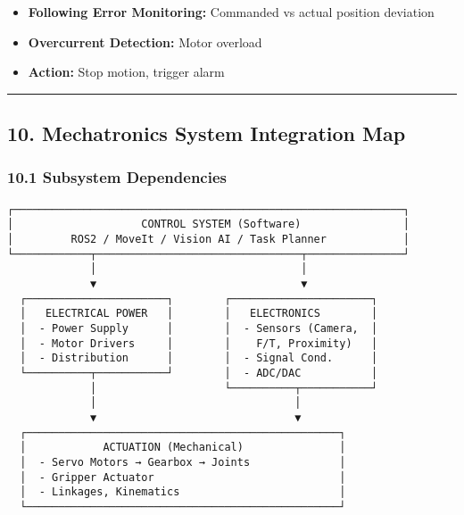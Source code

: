 \documentclass[
]{article}
\providecommand{\tightlist}{%
  \setlength{\itemsep}{0pt}\setlength{\parskip}{0pt}}
\begin{document}
\begin{itemize}
\tightlist
\item
  \textbf{Following Error Monitoring:} Commanded vs actual position
  deviation
\item
  \textbf{Overcurrent Detection:} Motor overload
\item
  \textbf{Action:} Stop motion, trigger alarm
\end{itemize}

\begin{center}\rule{0.5\linewidth}{0.5pt}\end{center}

\hypertarget{mechatronics-system-integration-map}{%
\subsection{10. Mechatronics System Integration
Map}\label{mechatronics-system-integration-map}}

\hypertarget{subsystem-dependencies}{%
\subsubsection{10.1 Subsystem
Dependencies}\label{subsystem-dependencies}}

\begin{verbatim}
┌─────────────────────────────────────────────────────────────┐
│                    CONTROL SYSTEM (Software)                │
│         ROS2 / MoveIt / Vision AI / Task Planner            │
└────────────┬────────────────────────────────┬───────────────┘
             │                                │
             ▼                                ▼
  ┌──────────────────────┐        ┌──────────────────────┐
  │   ELECTRICAL POWER   │        │   ELECTRONICS        │
  │  - Power Supply      │        │  - Sensors (Camera,  │
  │  - Motor Drivers     │        │    F/T, Proximity)   │
  │  - Distribution      │        │  - Signal Cond.      │
  └──────────┬───────────┘        │  - ADC/DAC           │
             │                    └──────────┬───────────┘
             │                               │
             ▼                               ▼
  ┌─────────────────────────────────────────────────┐
  │            ACTUATION (Mechanical)               │
  │  - Servo Motors → Gearbox → Joints              │
  │  - Gripper Actuator                             │
  │  - Linkages, Kinematics                         │
  └─────────────────────────────────────────────────┘
\end{verbatim}
\end{document}
